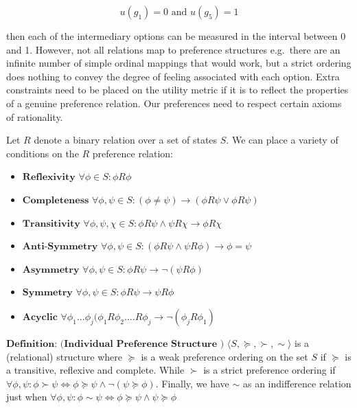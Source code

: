 \documentclass[]{tufte-book}
\theoremstyle{definition}
\theoremstyle{definition}
\theoremstyle{definition}
\theoremstyle{remark}
\begin{document}
\[ u(g_{1}) = 0 \text{ and } u(g_{5}) = 1 \]

then each of the intermediary options can be measured in the interval between 0 and 1. However, not all relations map to preference structures e.g.~there are an infinite number of simple ordinal mappings that would work, but a strict ordering does nothing to convey the degree of feeling associated with each option. Extra constraints need to be placed on the utility metric if it is to reflect the properties of a genuine preference relation. Our preferences need to respect certain axioms of rationality.

Let \(R\) denote a binary relation over a set of states \(S\). We can place a variety of conditions on the \(R\) preference relation:

\begin{itemize}
\item
  \(\textbf{Reflexivity}\) \(\forall \phi \in S: \phi R \phi\)
\item
  \(\textbf{Completeness}\) \(\forall \phi, \psi \in S: (\phi \neq \psi) \rightarrow (\phi R \psi \vee \phi R \psi)\)
\item
  \(\textbf{Transitivity}\) \(\forall \phi, \psi, \chi \in S: \phi R \psi \wedge \psi R \chi \rightarrow \phi R \chi\)
\item
  \(\textbf{Anti-Symmetry}\) \(\forall \phi, \psi \in S: (\phi R \psi \wedge \psi R \phi) \rightarrow \phi = \psi\)
\item
  \(\textbf{Asymmetry}\) \(\forall \phi, \psi \in S: \phi R \psi \rightarrow \neg(\psi R \phi)\)
\item
  \(\textbf{Symmetry}\) \(\forall \phi, \psi \in S: \phi R \psi \rightarrow \psi R \phi\)
\item
  \(\textbf{Acyclic}\) \(\forall \phi_{1} ... \phi_{j} ( \phi_{1} R \phi_{2} .... R \phi_{j} \rightarrow \neg(\phi_{j} R \phi_{1})\)
\end{itemize}

\(\textbf{Definition: (Individual Preference Structure )}\) \(\langle S, \succeq, \succ, \sim \rangle\) is a (relational) structure where \(\succeq\) is a weak preference ordering on the set \(S\) if \(\succeq\) is a transitive, reflexive and complete. While \(\succ\) is a strict preference ordering if \({\forall \phi, \psi : \phi \succ \psi \Leftrightarrow \phi \succeq \psi \wedge \neg(\psi \succeq \phi)}\). Finally, we have \(\sim\) as an indifference relation just when \({ \forall \phi, \psi : \phi \sim \psi \Leftrightarrow \phi \succeq \psi \wedge \psi \succeq \phi}\) \linebreak
\end{document}
